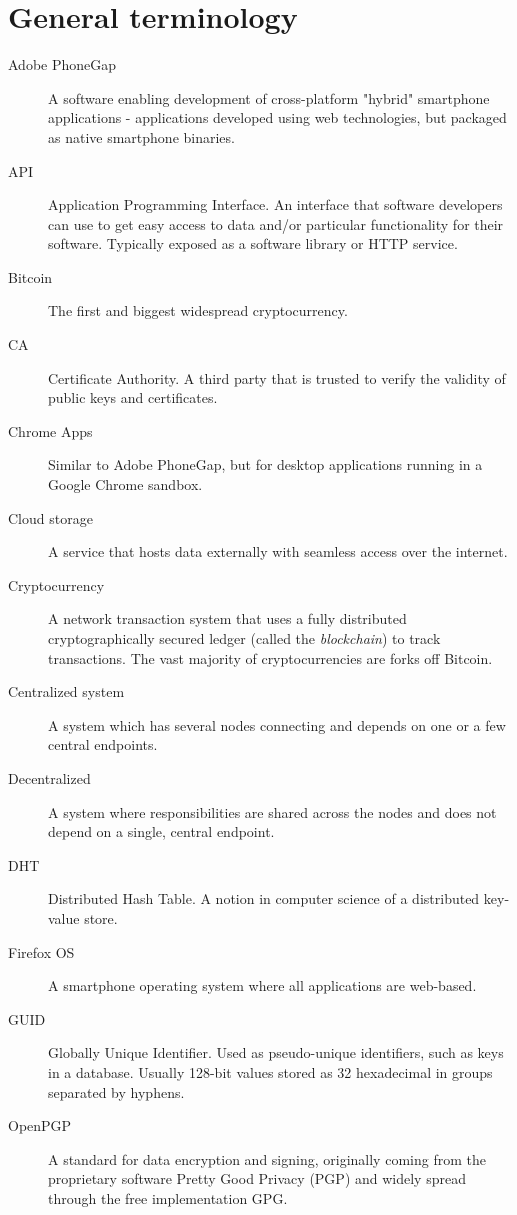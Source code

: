 \section{General terminology}
\begin{description}
  \item[Adobe PhoneGap] A software enabling development of cross-platform "hybrid" smartphone applications - applications developed using web technologies, but packaged as native smartphone binaries.
  \item[API] Application Programming Interface. An interface that software developers can use to get easy access to data and/or particular functionality for their software. Typically exposed as a software library or HTTP service.
  \item[Bitcoin] The first and biggest widespread cryptocurrency.
  \item[CA] Certificate Authority. A third party that is trusted to verify the validity of public keys and certificates.
  \item[Chrome Apps] Similar to Adobe PhoneGap, but for desktop applications running in a Google Chrome sandbox.
  \item[Cloud storage] A service that hosts data externally with seamless access over the internet.
  \item[Cryptocurrency] A network transaction system that uses a fully distributed cryptographically secured ledger (called the \emph{blockchain}) to track transactions. The vast majority of cryptocurrencies are forks off Bitcoin.
  \item[Centralized system] A system which has several nodes connecting and depends on one or a few central endpoints.
  \item[Decentralized] A system where responsibilities are shared across the nodes and does not depend on a single, central endpoint.
  \item[DHT] Distributed Hash Table. A notion in computer science of a distributed key-value store.
  \item[Firefox OS] A smartphone operating system where all applications are web-based.
  \item[GUID] Globally Unique Identifier. Used as pseudo-unique identifiers, such as keys in a database. Usually 128-bit values stored as 32 hexadecimal in groups separated by hyphens. 
  \item[OpenPGP] A standard for data encryption and signing, originally coming from the proprietary software Pretty Good Privacy (PGP) and widely spread through the free implementation GPG.

\end{description}
